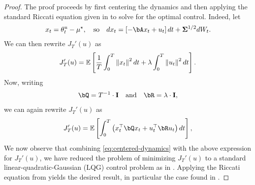 \begin{proof}
    The proof proceeds by first centering the dynamics and then applying the standard Riccati equation given in  to solve for the optimal control.  Indeed, let
    \begin{align}\label{eq:centered-dynamics}
        x_t = \theta_t^u - \mustar, \quad \text{so} \quad d x_t = \left[ - \bA x_t + u_t \right] d t + \bSigma^{1/2} d W_t.
    \end{align}
    We can then rewrite $J_T'(u)$ as
    \begin{align}
        J_T'(u) = \mathbb{E}\left[ \frac 1T \int_0^T \left\|x_t\right\|^2 d t + \lambda \int_0^T \left\|u_t\right\|^2 d t \right].
    \end{align}
    Now, writing
    \begin{align}
        \bQ = T^{-1} \cdot \eye \quad \text{and} \quad \bR = \lambda \cdot \eye,
    \end{align}
    we can again rewrite $J_T'(u)$ as
    \begin{align}
        J_T'(u) = \ee\left[ \int_0^T \left( x_t^\top \bQ x_t + u_t^\top \bR u_t \right) d t \right],
    \end{align}
    We now observe that combining \eqref{eq:centered-dynamics} with the above expression for $J_T'(u)$, we have reduced the problem of minimizing $J_T'(u)$ to a standard linear-quadratic-Gaussian (LQG) control problem as in .  Applying the Riccati equation from  yields the desired result, in particular the case found in .


\end{proof}
